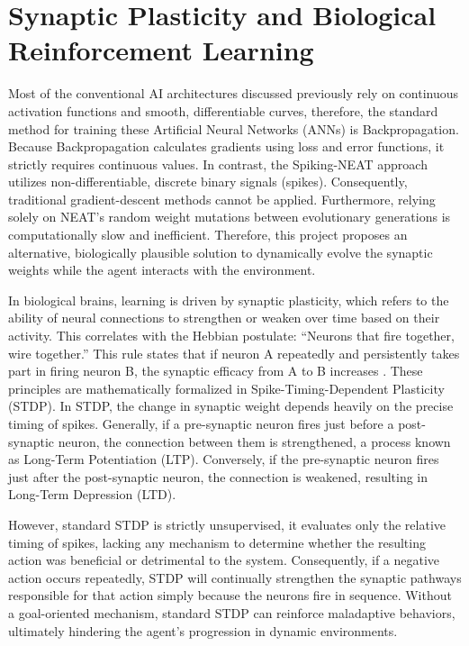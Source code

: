 \section{Synaptic Plasticity and Biological Reinforcement Learning}

Most of the conventional AI architectures discussed previously rely on continuous activation functions and smooth, differentiable curves, therefore, the standard method for training these Artificial Neural Networks (ANNs) is Backpropagation. Because Backpropagation calculates gradients using loss and error functions, it strictly requires continuous values. In contrast, the Spiking-NEAT approach utilizes non-differentiable, discrete binary signals (spikes). Consequently, traditional gradient-descent methods cannot be applied. Furthermore, relying solely on NEAT's random weight mutations between evolutionary generations is computationally slow and inefficient. Therefore, this project proposes an alternative, biologically plausible solution to dynamically evolve the synaptic weights while the agent interacts with the environment.

In biological brains, learning is driven by synaptic plasticity, which refers to the ability of neural connections to strengthen or weaken over time based on their activity. This correlates with the Hebbian postulate: ``Neurons that fire together, wire together.'' This rule states that if neuron A repeatedly and persistently takes part in firing neuron B, the synaptic efficacy from A to B increases \cite{gerstner2014}. These principles are mathematically formalized in Spike-Timing-Dependent Plasticity (STDP). In STDP, the change in synaptic weight depends heavily on the precise timing of spikes. Generally, if a pre-synaptic neuron fires just before a post-synaptic neuron, the connection between them is strengthened, a process known as Long-Term Potentiation (LTP). Conversely, if the pre-synaptic neuron fires just after the post-synaptic neuron, the connection is weakened, resulting in Long-Term Depression (LTD).

However, standard STDP is strictly unsupervised, it evaluates only the relative timing of spikes, lacking any mechanism to determine whether the resulting action was beneficial or detrimental to the system. Consequently, if a negative action occurs repeatedly, STDP will continually strengthen the synaptic pathways responsible for that action simply because the neurons fire in sequence. Without a goal-oriented mechanism, standard STDP can reinforce maladaptive behaviors, ultimately hindering the agent's progression in dynamic environments.

